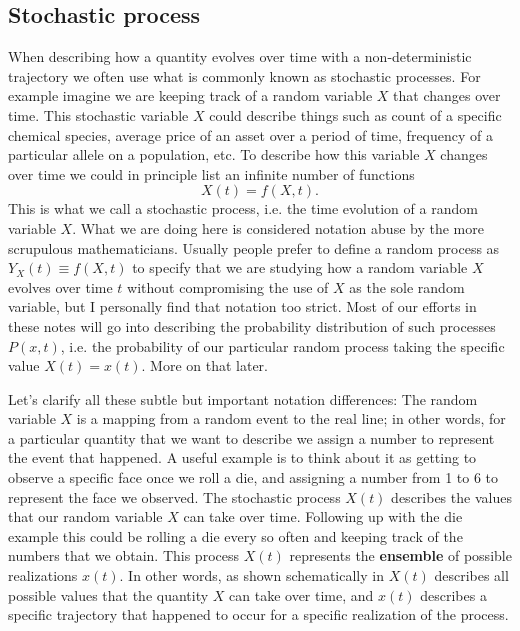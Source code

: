 \subsection{Stochastic process}

When describing how a quantity evolves over time with a non-deterministic
trajectory we often use what is commonly known as stochastic processes. For
example imagine we are keeping track of a random variable $X$ that changes over
time. This stochastic variable $X$ could describe things such as count of a
specific chemical species, average price of an asset over a period of time,
frequency of a particular allele on a population, etc. To describe how this
variable $X$ changes over time we could in principle list an infinite number of
functions
\begin{equation}
  X(t) = f(X, t).
\end{equation}
This is what we call a stochastic process, i.e. the time evolution of a random
variable $X$. What we are doing here is considered notation abuse by the more
scrupulous mathematicians. Usually people prefer to define a random process as
$Y_X(t) \equiv f(X, t)$ to specify that we are studying how a random variable
$X$ evolves over time $t$ without compromising the use of $X$ as the sole
random variable, but I personally find that notation too strict. Most of our
efforts in these notes will go into describing the probability distribution of
such processes $P(x, t)$, i.e. the probability of our particular random process
taking the specific value $X(t) = x(t)$. More on that later.

Let's clarify all these subtle but important notation differences: The random
variable $X$ is a mapping from a random event to the real line; in other words,
for a particular quantity that we want to describe we assign a number to
represent the event that happened. A useful example is to think about it as
getting to observe a specific face once we roll a die, and assigning a number
from 1 to 6 to represent the face we observed. The stochastic process $X(t)$
describes the values that our random variable $X$ can take over time. Following
up with the die example this could be rolling a die every so often and keeping
track of the numbers that we obtain. This process $X(t)$ represents the
\textbf{ensemble} of possible realizations $x(t)$. In other words, as shown
schematically in  $X(t)$ describes all possible
values that the quantity $X$ can take over time, and $x(t)$ describes a
specific trajectory that happened to occur for a specific realization of the
process.

